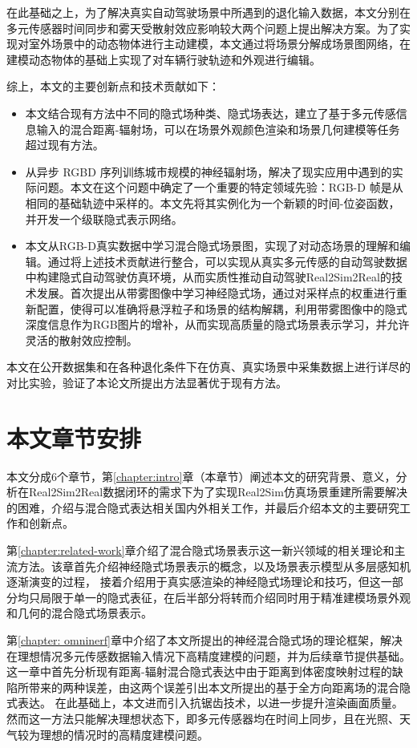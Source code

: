 在此基础之上，为了解决真实自动驾驶场景中所遇到的退化输入数据，本文分别在多元传感器时间同步和雾天受散射效应影响较大两个问题上提出解决方案。为了实现对室外场景中的动态物体进行主动建模，本文通过将场景分解成场景图网络，在建模动态物体的基础上实现了对车辆行驶轨迹和外观进行编辑。

综上，本文的主要创新点和技术贡献如下：
\begin{itemize}
    \item 本文结合现有方法中不同的隐式场种类、隐式场表达，建立了基于多元传感信息输入的混合距离-辐射场，可以在场景外观颜色渲染和场景几何建模等任务超过现有方法。
    \item 从异步 RGBD 序列训练城市规模的神经辐射场，解决了现实应用中遇到的实际问题。本文在这个问题中确定了一个重要的特定领域先验：RGB-D 帧是从相同的基础轨迹中采样的。本文先将其实例化为一个新颖的时间-位姿函数，并开发一个级联隐式表示网络。
    \item 本文从RGB-D真实数据中学习混合隐式场景图，实现了对动态场景的理解和编辑。通过将上述技术贡献进行整合，可以实现从真实多元传感的自动驾驶数据中构建隐式自动驾驶仿真环境，从而实质性推动自动驾驶Real2Sim2Real的技术发展。首次提出从带雾图像中学习神经隐式场，通过对采样点的权重进行重新配置，使得可以准确将悬浮粒子和场景的结构解耦，利用带雾图像中的隐式深度信息作为RGB图片的增补，从而实现高质量的隐式场景表示学习，并允许灵活的散射效应控制。
\end{itemize}

本文在公开数据集和在各种退化条件下在仿真、真实场景中采集数据上进行详尽的对比实验，验证了本论文所提出方法显著优于现有方法。


\section{本文章节安排}
本文分成6个章节，第\ref{chapter:intro}章（本章节）阐述本文的研究背景、意义，分析在Real2Sim2Real数据闭环的需求下为了实现Real2Sim仿真场景重建所需要解决的困难，介绍与混合隐式表达相关国内外相关工作，并最后介绍本文的主要研究工作和创新点。

第\ref{chapter:related-work}章介绍了混合隐式场景表示这一新兴领域的相关理论和主流方法。该章首先介绍神经隐式场景表示的概念，以及场景表示模型从多层感知机逐渐演变的过程， 接着介绍用于真实感渲染的神经隐式场理论和技巧，但这一部分均只局限于单一的隐式表征，在后半部分将转而介绍同时用于精准建模场景外观和几何的混合隐式场景表示。

第\ref{chapter: omninerf}章中介绍了本文所提出的神经混合隐式场的理论框架，解决在理想情况多元传感数据输入情况下高精度建模的问题，并为后续章节提供基础。这一章中首先分析现有距离-辐射混合隐式表达中由于距离到体密度映射过程的缺陷所带来的两种误差，由这两个误差引出本文所提出的基于全方向距离场的混合隐式表达。 在此基础上，本文进而引入抗锯齿技术，以进一步提升渲染画面质量。然而这一方法只能解决理想状态下，即多元传感器均在时间上同步，且在光照、天气较为理想的情况时的高精度建模问题。

